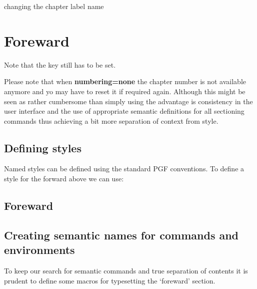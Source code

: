 \begin{texexample}{changing the chapter label name}{}
\chapter{Foreward}
\lorem
\end{texexample}

Note that the key  still has to be set.


Please note that when \textbf{numbering=none} the chapter number is not available anymore and yo may have to reset it if required again. Although this might be seen as rather cumbersome than simply using  the advantage is consistency in the user interface and the use of appropriate semantic definitions for all sectioning commands thus achieving a bit more separation of context from style.



\section{Defining styles}

Named styles can be defined using the standard \textsc{PGF} conventions. To define a style for the forward above we can use:

\begin{texexample}{}{}
\chapter{Foreward}
\lorem
\end{texexample}



\section{Creating semantic names for commands and environments}

To keep our search for semantic commands and true separation of contents it is prudent to define some macros for typesetting the  `foreward' section.

